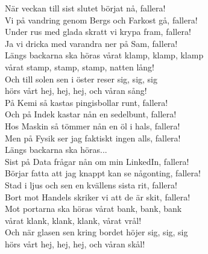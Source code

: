 \documentclass[a6paper, 10pt, twoside]{article}
\begin{document}
\begin{center}
\end{center}
\begin{lyrics}
När veckan till sist slutet börjat nå, fallera!\\
Vi på vandring genom Bergs och Farkost gå, fallera!\\
Under rus med glada skratt vi krypa fram, fallera!\\
Ja vi dricka med varandra ner på Sam, fallera!
\vspace{5pt}\\
Längs backarna ska höras vårat klamp, klamp, klamp\\
vårat stamp, stamp, stamp, natten lång!\\
Och till solen sen i öster reser sig, sig, sig\\
hörs vårt hej, hej, hej, och våran sång!
\vspace{5pt}\\
På Kemi så kastas pingisbollar runt, fallera!\\
Och på Indek kastar nån en sedelbunt, fallera!\\
Hos Maskin så tömmer nån en öl i hals, fallera!\\
Men på Fysik ser jag faktiskt ingen alls, fallera!
\vspace{5pt}\\
Längs backarna ska höras...
\vspace{5pt}\\
Sist på Data frågar nån om min LinkedIn, fallera!\\
Börjar fatta att jag knappt kan se någonting, fallera!\\
Stad i ljus och sen en kvällens sista rit, fallera!\\
Bort mot Handels skriker vi att de är skit, fallera!
\vspace{5pt}\\
Mot portarna ska höras vårat bank, bank, bank\\
vårat klank, klank, klank, vårat vrål!\\
Och när glasen sen kring bordet höjer sig, sig, sig\\
hörs vårt hej, hej, hej, och våran skål!\\
\end{lyrics}


\setlength{\oddsidemargin}{-0.47in}
\end{document}
